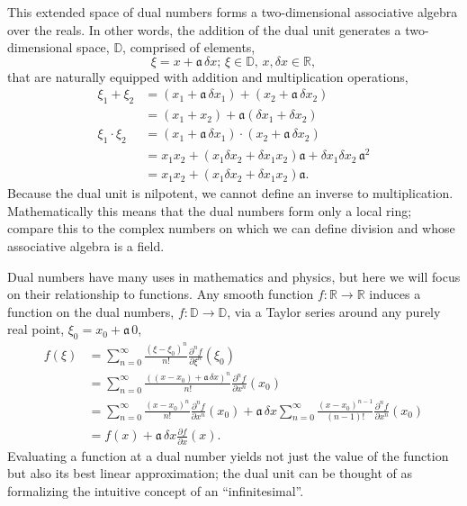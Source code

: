 This extended space of dual numbers forms a two-dimensional associative algebra 
over the reals.  In other words, the addition of the dual unit generates a two-dimensional
space, $\mathbb{D}$, comprised of elements,
%
\begin{equation*}
\xi = x + \mathfrak{a} \, \delta x; \, \xi \in \mathbb{D}, \, x, \delta x \in \mathbb{R},
\end{equation*}
%
that are naturally equipped with addition and multiplication operations,
%
\begin{align*}
\xi_{1} + \xi_{2} 
&=
 \left( x_{1} + \mathfrak{a} \, \delta x_{1} \right) 
 + \left( x_{2} + \mathfrak{a} \,  \delta x_{2} \right) 
\\
&=
\left( x_{1} + x_{2} \right) 
+ \mathfrak{a} \left( \delta x_{1} + \delta x_{2} \right) 
\\
\xi_{1} \cdot \xi_{2} 
&= 
\left( x_{1} + \mathfrak{a} \, \delta x_{1} \right) 
\cdot \left( x_{2} + \mathfrak{a} \, \delta x_{2} \right) 
\\
&= 
x_{1} x_{2} + \left( x_{1} \delta x_{2} 
+ \delta x_{1} x_{2} \right) \mathfrak{a} 
+ \delta x_{1} \delta x_{2} \, \mathfrak{a}^{2} 
\\
&= 
x_{1} x_{2} + \left( x_{1} \delta x_{2} + \delta x_{1} x_{2} \right) \mathfrak{a}.
\end{align*}  
%
Because the dual unit is nilpotent, we cannot define an inverse to multiplication.  
Mathematically this means that the dual numbers form only a local ring; compare this to 
the complex numbers on which we can define division and whose associative algebra is a field.

Dual numbers have many uses in mathematics and physics, but here we will focus on their
relationship to functions.  Any smooth function $f : \mathbb{R} \rightarrow \mathbb{R}$ 
induces a function on the dual numbers, $f : \mathbb{D} \rightarrow \mathbb{D}$, 
via a Taylor series around any purely real point, $\xi_{0} = x_{0} + \mathfrak{a} \, 0$,
%
\begin{align*}
f \! \left( \xi \right) 
&= 
\sum_{n = 0}^{\infty} \frac{ \left( \xi - \xi_{0} \right)^{n} }{n!} 
\frac{ \partial^{n} f }{ \partial \xi^{n} } \! \left( \xi_{0} \right) 
\\
&= 
\sum_{n = 0}^{\infty} \frac{ \left( \left( x - x_{0} \right) + \mathfrak{a} \, \delta x \right)^{n} }{n!} 
\frac{ \partial^{n} f }{ \partial x^{n} } \! \left( x_{0} \right)
\\
&= 
\sum_{n = 0}^{\infty} \frac{ \left( x - x_{0} \right)^{n} }{n!} 
\frac{ \partial^{n} f }{ \partial x^{n} } \! \left( x_{0} \right)
+ \mathfrak{a} \, \delta x \sum_{n = 0}^{\infty} \frac{ \left( x - x_{0} \right)^{n - 1} }{\left( n - 1 \right)!} 
\frac{ \partial^{n} f }{ \partial x^{n} } \! \left( x_{0} \right) 
\\
&= 
f \! \left( x \right) 
+ \mathfrak{a} \, \delta x \frac{ \partial f }{ \partial x } \! \left( x \right).
\end{align*}
%
Evaluating a function at a dual number yields not just the value of the function but
also its best linear approximation; the dual unit can be thought of as formalizing the 
intuitive concept of an ``infinitesimal''.

